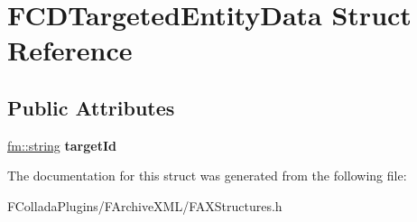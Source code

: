 \hypertarget{structFCDTargetedEntityData}{
\section{FCDTargetedEntityData Struct Reference}
\label{structFCDTargetedEntityData}
}
\subsection*{Public Attributes}
\begin{DoxyCompactItemize}
\item 
\hypertarget{structFCDTargetedEntityData_ad64ad27c8cf8d397204f00e6bdd78179}{
\hyperlink{classfm_1_1stringT}{fm::string} {\bfseries targetId}}
\label{structFCDTargetedEntityData_ad64ad27c8cf8d397204f00e6bdd78179}

\end{DoxyCompactItemize}


The documentation for this struct was generated from the following file:\begin{DoxyCompactItemize}
\item 
FColladaPlugins/FArchiveXML/FAXStructures.h\end{DoxyCompactItemize}
